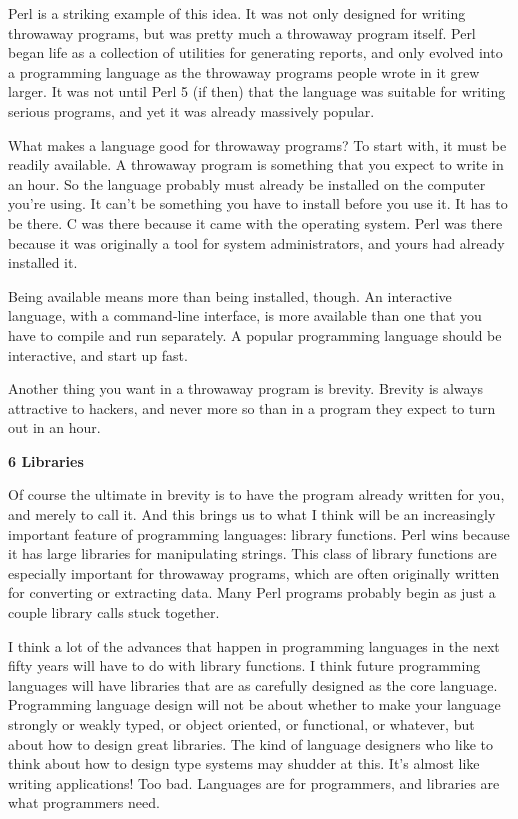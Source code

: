 \documentclass[12pt]{book}
\begin{document}
Perl is a striking example of this idea. It was not only designed for
writing throwaway programs, but was pretty much a throwaway program
itself. Perl began life as a collection of utilities for generating
reports, and only evolved into a programming language as the throwaway
programs people wrote in it grew larger. It was not until Perl 5 (if
then) that the language was suitable for writing serious programs, and
yet it was already massively popular.

What makes a language good for throwaway programs? To start with, it
must be readily available. A throwaway program is something that you
expect to write in an hour. So the language probably must already be
installed on the computer you're using. It can't be something you have
to install before you use it. It has to be there. C was there because it
came with the operating system. Perl was there because it was originally
a tool for system administrators, and yours had already installed it.

Being available means more than being installed, though. An interactive
language, with a command-line interface, is more available than one that
you have to compile and run separately. A popular programming language
should be interactive, and start up fast.

Another thing you want in a throwaway program is brevity. Brevity is
always attractive to hackers, and never more so than in a program they
expect to turn out in an hour.

\textbf{6 Libraries}

Of course the ultimate in brevity is to have the program already written
for you, and merely to call it. And this brings us to what I think will
be an increasingly important feature of programming languages: library
functions. Perl wins because it has large libraries for manipulating
strings. This class of library functions are especially important for
throwaway programs, which are often originally written for converting or
extracting data. Many Perl programs probably begin as just a couple
library calls stuck together.

I think a lot of the advances that happen in programming languages in
the next fifty years will have to do with library functions. I think
future programming languages will have libraries that are as carefully
designed as the core language. Programming language design will not be
about whether to make your language strongly or weakly typed, or object
oriented, or functional, or whatever, but about how to design great
libraries. The kind of language designers who like to think about how to
design type systems may shudder at this. It's almost like writing
applications! Too bad. Languages are for programmers, and libraries are
what programmers need.
\end{document}
